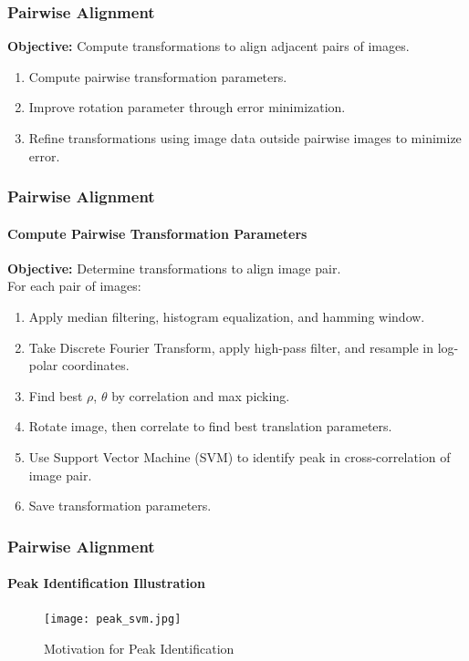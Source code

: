 \documentclass{beamer}
\begin{document}
\begin{frame}
\frametitle{Pairwise Alignment}
\textbf{Objective:} Compute transformations to align adjacent pairs of images. \\
\begin{enumerate}
\item Compute pairwise transformation parameters.
\item Improve rotation parameter through error minimization.
\item Refine transformations using image data outside pairwise images to minimize error.
\end{enumerate}
\end{frame}

\begin{frame}
\frametitle{Pairwise Alignment}
\framesubtitle{Compute Pairwise Transformation Parameters}
\textbf{Objective:} Determine transformations to align image pair. \\
For each pair of images:
\begin{enumerate}
\item Apply median filtering, histogram equalization, and hamming window. 
\item Take Discrete Fourier Transform, apply high-pass filter, and resample in log-polar coordinates. 
\item Find best $\rho$, $\theta$ by correlation and max picking. 
\item Rotate image, then correlate to find best translation parameters.
\item Use Support Vector Machine (SVM) to identify peak in cross-correlation of image pair. 
\item Save transformation parameters.
\end{enumerate}
\end{frame}

\begin{frame}
\frametitle{Pairwise Alignment}
\framesubtitle{Peak Identification Illustration}
\begin{figure}[p]
	\centering
	\texttt{[image: peak\_svm.jpg]}
	\caption{Motivation for Peak Identification}
\end{figure}
\end{frame}
\end{document}
